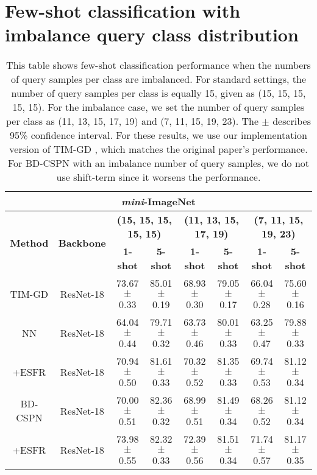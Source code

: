 \documentclass{article}
\begin{document}
\section{Few-shot classification with imbalance query class distribution}
\label{section:imbalance}
\begin{table}[t]
	\begin{small}
		\caption{
			This table shows few-shot classification performance when the numbers of query samples per class are imbalanced.
			For standard settings, the number of query samples per class is equally 15, given as (15, 15, 15, 15, 15).
			For the imbalance case, we set the number of query samples per class as (11, 13, 15, 17, 19) and (7, 11, 15, 19, 23).
			The $\pm$ describes 95\% confidence interval.
			For these results, we use our implementation version of TIM-GD \cite{TIM}, which matches the original paper's performance.
			For BD-CSPN \cite{BDCSPN} with an imbalance number of query samples, we do not use shift-term since it worsens the performance.}
		\label{table:imbalance}
		\begin{center}
			\begin{tabular}{cccccccc}
				\hline
				\multicolumn{8}{c}{\textbf{\textit{mini}-ImageNet}} \\ \hline
				\multirow{2}{*}{\textbf{Method}} & \multirow{2}{*}{\textbf{Backbone}} & \multicolumn{2}{c}{\textbf{(15, 15, 15, 15, 15)}} & \multicolumn{2}{c}{\textbf{(11, 13, 15, 17, 19)}} & \multicolumn{2}{c}{\textbf{(7, 11, 15, 19, 23)}} \\
				&  & \textbf{1-shot} & \textbf{5-shot} & \textbf{1-shot} & \textbf{5-shot} & \textbf{1-shot} & \textbf{5-shot} \\ \hline
				TIM-GD & ResNet-18 & 73.67$\pm$0.33 & 85.01$\pm$0.19 & 68.93$\pm$0.30 & 79.05$\pm$0.17 & 66.04$\pm$0.28 & 75.60$\pm$0.16 \\ \hline
				NN & ResNet-18 & 64.04$\pm$0.44 & 79.71$\pm$0.32 & 63.73$\pm$0.46 & 80.01$\pm$0.33 & 63.25$\pm$0.47 & 79.88$\pm$0.33 \\
				\rowcolor[HTML]{EFEFEF}+ESFR & ResNet-18 & 70.94$\pm$0.50 & 81.61$\pm$0.33 & 70.32$\pm$0.52 & 81.35$\pm$0.33 & 69.74$\pm$0.53 & 81.12$\pm$0.34 \\ \hline
				BD-CSPN & ResNet-18 & 70.00$\pm$0.51 & 82.36$\pm$0.32 & 68.99$\pm$0.51 & 81.49$\pm$0.34 & 68.26$\pm$0.52 & 81.12$\pm$0.34 \\
				\rowcolor[HTML]{EFEFEF}+ESFR & ResNet-18 & 73.98$\pm$0.55 & 82.32$\pm$0.33 & 72.39$\pm$0.56 & 81.51$\pm$0.34 & 71.74$\pm$0.57 & 81.17$\pm$0.35 \\ \hline

\end{tabular}
\end{center}
\end{small}
\end{table}
\end{document}
